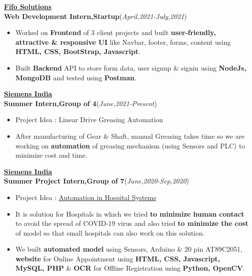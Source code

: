 \documentclass[10pt]{extarticle}
\begin{document}
\vspace{-2pt}
\href{https://www.linkedin.com/company/fifo-solutions/}{\textbf{Fifo Solutions}}\\
\textbf{Web Development Intern,Startup}\hfill\hfill(\textit{April,2021-July,2021})
    \begin{itemize}
        \item Worked on \textbf{Frontend} of 3 client projects and built \textbf{user-friendly, attractive \& responsive UI} like Navbar, footer, forms, content using \textbf{HTML, CSS, BootStrap, Javascript}.
        \item Built \textbf{Backend} API to store form data, user signup \& signin using \textbf{NodeJs, MongoDB} and tested using \textbf{Postman}.
    \end{itemize}
\vspace{3pt}
\href{http://www.siemens.com/}{\textbf{Siemens India}}\\
\textbf{Summer Intern,Group of 4}\hfill\hfill(\textit{June,2021-Present})
     \begin{itemize}
         \item Project Idea : Linear Drive Greasing Automation
         \item After manufacturing of Gear \& Shaft, manual Greasing takes time so we are working on \textbf{automation} of greasing mechanism (using Sensors and PLC) to minimize cost and time.
     \end{itemize}
\vspace{3pt}
\href{https://drive.google.com/file/d/11Zo1hU3lB8NY-Y8Fw1PP3Qvl0AB8fPBY/view?usp=sharing}{\textbf{Siemens India}}\\
\textbf{Summer Project Intern,Group of 7}\hfill\hfill(\textit{June,2020-Sep,2020})
      \begin{itemize}
          \item Project Idea : \href{https://github.com/PSoni8/Automation-in-Hospital-Systems}{Automation in Hospital Systems}
          \item It is solution for Hospitals in which we tried \textbf{to minimize human contact} to avoid the spread of COVID-19 virus and also tried \textbf{to minimize the cost} of model so that small hospitals can also work on this solution.
          \item We built \textbf{automated model} using Sensors, Arduino \& 20 pin AT89C2051, \textbf{website} for Online Appointment using \textbf{HTML, CSS, Javascript, MySQL, PHP} \& \textbf{OCR} for Offline Registration using \textbf{Python, OpenCV}.
      \end{itemize}
\end{document}
